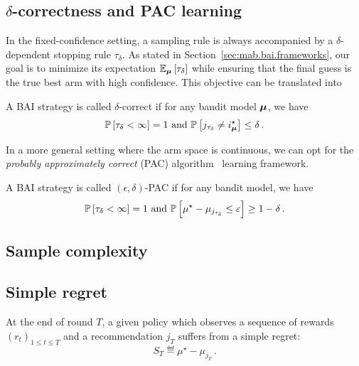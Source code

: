 \subsection{$\delta$-correctness and PAC learning}\label{sec:mab.performance.pac}

In the fixed-confidence setting, a sampling rule is always accompanied by a $\delta$-dependent stopping rule $\tau_{\delta}$. As stated in Section~\ref{sec:mab.bai.frameworks}, our goal is to minimize its expectation $\mathbb{E}_{{\boldsymbol \mu}}\left[\tau_{\delta}\right]$ while ensuring that the final guess is the true best arm with high confidence. This objective can be translated into

\begin{definition}
\begin{leftbar}[defnbar]
A BAI strategy is called $\delta$-correct if for any bandit model ${\boldsymbol \mu}$, we have
\[
	\mathbb{P}\left[\tau_\delta < \infty\right] = 1 \text{ and } \mathbb{P}\left[j_{\tau_\delta}\neq i_{{\boldsymbol \mu}}^{\star}\right] \leq \delta\,.
\]
\end{leftbar}
\end{definition}

In a more general setting where the arm space is continuous, we can opt for the \emph{probably approximately correct} (PAC) algorithm~\citep{valiant1984pac} learning framework.

\begin{definition}
\begin{leftbar}[defnbar]
A BAI strategy is called $(\epsilon,\delta)$-PAC if for any bandit model, we have
\[
	\mathbb{P}\left[\tau_\delta < \infty\right] = 1 \text{ and } \mathbb{P}\left[\mu^\star-\mu_{j_{\tau_\delta}}\leq \varepsilon\right] \geq 1-\delta\,.
\]
\end{leftbar}
\end{definition}

\subsection{Sample complexity}\label{sec:mab.performance.sample}

\subsection{Simple regret}\label{sec:mab.performance.simple}

\begin{definition}\label{def:stoch_mab.simple_regret}
\begin{leftbar}[defnbar]
	At the end of round $T$, a given policy which observes a sequence of rewards $(r_t)_{1 \leq t \leq T}$ and a recommendation $j_T$ suffers from a simple regret:
	\[
		S_T \eqdef \mu^{\star} - \mu_{j_T}\,.
	\]
\end{leftbar}
\end{definition}